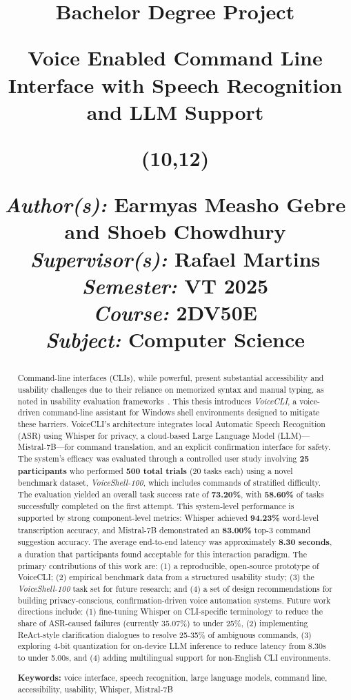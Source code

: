 \documentclass[a4paper,12pt]{article}
\title{
\vspace{-8cm}
\begin{sidebar}
    \vspace{10cm}
    \normalfont \normalsize
    \Huge Bachelor Degree Project \\
    \vspace{-1.3cm}
\end{sidebar}
\vspace{3cm}
\begin{flushleft}
    \huge Voice Enabled Command Line Interface with Speech Recognition and LLM Support\\ 
\end{flushleft}
\null
\vfill
\begin{textblock}{6}(10,12)
\begin{flushright}
\begin{minipage}{\textwidth}
\begin{flushleft} \large
\emph{Author(s):} Earmyas Measho Gebre and Shoeb Chowdhury\\
\emph{Supervisor(s):} Rafael Martins\\ 
\emph{Semester:} VT 2025\\
\emph{Course:} 2DV50E \\
\emph{Subject:} Computer Science \\
\end{flushleft}
\end{minipage}
\end{flushright}
\end{textblock}
}
\date{}
\newcommand\BackgroundPic{
    \put(-2,-3){
    \texttt{[image: img/lnu\_etch.png]}
    }
}
\newcommand\BackgroundPicLogo{
    \put(30,740){
    \texttt{[image: img/logo.png]}
    }
}
\begin{document}
\AddToShipoutPicture*{\BackgroundPic}
\AddToShipoutPicture*{\BackgroundPicLogo}
\maketitle
\restoregeometry
{}

\begin{abstract}
\noindent Command-line interfaces (CLIs), while powerful, present substantial accessibility and usability challenges due to their reliance on memorized syntax and manual typing, as noted in usability evaluation frameworks~\cite{ref16}. This thesis introduces \textit{VoiceCLI}, a voice-driven command-line assistant for Windows shell environments designed to mitigate these barriers. VoiceCLI's architecture integrates local Automatic Speech Recognition (ASR) using Whisper for privacy, a cloud-based Large Language Model (LLM)—Mistral-7B—for command translation, and an explicit confirmation interface for safety. The system's efficacy was evaluated through a controlled user study involving \textbf{25 participants} who performed \textbf{500 total trials} (20 tasks each) using a novel benchmark dataset, \textit{VoiceShell-100}, which includes commands of stratified difficulty. The evaluation yielded an overall task success rate of \textbf{73.20\%}, with \textbf{58.60\%} of tasks successfully completed on the first attempt. This system-level performance is supported by strong component-level metrics: Whisper achieved \textbf{94.23\%} word-level transcription accuracy, and Mistral-7B demonstrated an \textbf{83.00\%} top-3 command suggestion accuracy. The average end-to-end latency was approximately \textbf{8.30 seconds}, a duration that participants found acceptable for this interaction paradigm. The primary contributions of this work are: (1) a reproducible, open-source prototype of VoiceCLI; (2) empirical benchmark data from a structured usability study; (3) the \textit{VoiceShell-100} task set for future research; and (4) a set of design recommendations for building privacy-conscious, confirmation-driven voice automation systems. Future work directions include: (1) fine-tuning Whisper on CLI-specific terminology to reduce the share of ASR-caused failures (currently 35.07\%) to under 25\%, (2) implementing ReAct-style clarification dialogues to resolve 25-35\% of ambiguous commands, (3) exploring 4-bit quantization for on-device LLM inference to reduce latency from 8.30s to under 5.00s, and (4) adding multilingual support for non-English CLI environments.

\vspace{1em}

\noindent\textbf{Keywords:} voice interface, speech recognition, large language models, command line, accessibility, usability, Whisper, Mistral-7B
\end{abstract}
\end{document}
